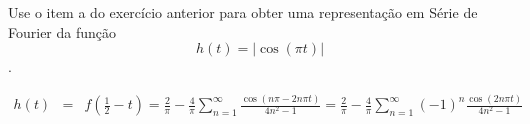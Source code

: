 \begin{Exercise}{\label{Fourier_9}}
 Use o item a do exercício anterior para obter uma representação em Série de Fourier da função $$h(t)=|\cos(\pi t)|$$.
\end{Exercise}

\begin{Answer}
 \begin{eqnarray*}
h(t)&=&f\left(\frac{1}{2}-t\right)=\frac{2}{\pi}- \frac{4}{\pi}\sum_{n=1}^\infty \frac{\cos\left(n\pi-2n\pi t\right)}{4n^2-1}=\frac{2}{\pi}- \frac{4}{\pi}\sum_{n=1}^\infty(-1)^n \frac{\cos\left(2n\pi t\right)}{4n^2-1}
 \end{eqnarray*}

\end{Answer}




%